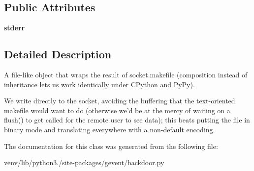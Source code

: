 \subsection*{Public Attributes}
\begin{DoxyCompactItemize}
\item 
\mbox{\label{classgevent_1_1backdoor_1_1__fileobject_ae2103806d986d9b8af189aeca12143fe}} 
{\bfseries stderr}
\end{DoxyCompactItemize}


\subsection{Detailed Description}
\begin{DoxyVerb}A file-like object that wraps the result of socket.makefile (composition
instead of inheritance lets us work identically under CPython and PyPy).

We write directly to the socket, avoiding the buffering that the text-oriented
makefile would want to do (otherwise we'd be at the mercy of waiting on a
flush() to get called for the remote user to see data); this beats putting
the file in binary mode and translating everywhere with a non-default
encoding.
\end{DoxyVerb}
 

The documentation for this class was generated from the following file\+:\begin{DoxyCompactItemize}
\item 
venv/lib/python3./site-\/packages/gevent/backdoor.\+py\end{DoxyCompactItemize}
